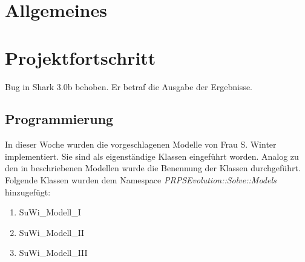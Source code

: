 \documentclass[a4paper,12pt,fleqn]{article}
\begin{document}
\setlength{\headheight}{36pt}

\begin{titlepage}



\end{titlepage}

\section[Allgemeines]{Allgemeines}
%
%
\section[Fortschritt]{Projektfortschritt}
%
Bug in Shark 3.0b behoben. Er betraf die Ausgabe der Ergebnisse.
%
\subsection{Programmierung}
%
In dieser Woche wurden die vorgeschlagenen Modelle von Frau S. Winter implementiert. Sie sind als eigenständige Klassen eingeführt worden. Analog zu den in \cite{WinAmed13} beschriebenen Modellen wurde die Benennung der Klassen durchgeführt. Folgende Klassen wurden dem Namespace \textit{PRPSEvolution::Solve::Models} hinzugefügt:
\begin{enumerate}
\item SuWi_Modell_I
\item SuWi_Modell_II
\item SuWi_Modell_III
\end{enumerate}

%
%
\end{document}
